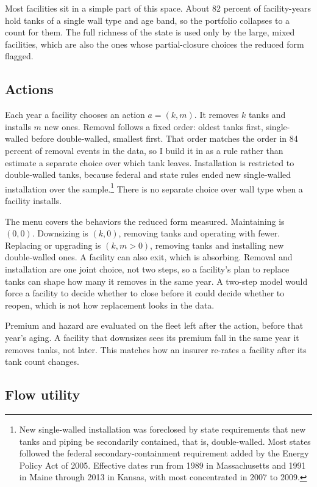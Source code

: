 \documentclass[
  12pt,
]{article}
\begin{document}
Most facilities sit in a simple part of this space. About 82 percent of
facility-years hold tanks of a single wall type and age band, so the
portfolio collapses to a count for them. The full richness of the state
is used only by the large, mixed facilities, which are also the ones
whose partial-closure choices the reduced form flagged.

\subsection{Actions}\label{actions}

Each year a facility chooses an action \(a = (k, m)\). It removes \(k\)
tanks and installs \(m\) new ones. Removal follows a fixed order: oldest
tanks first, single-walled before double-walled, smallest first. That
order matches the order in 84 percent of removal events in the data, so
I build it in as a rule rather than estimate a separate choice over
which tank leaves. Installation is restricted to double-walled tanks,
because federal and state rules ended new single-walled installation
over the sample.\footnote{New single-walled installation was foreclosed
  by state requirements that new tanks and piping be secondarily
  contained, that is, double-walled. Most states followed the federal
  secondary-containment requirement added by the Energy Policy Act of
  2005. Effective dates run from 1989 in Massachusetts and 1991 in Maine
  through 2013 in Kansas, with most concentrated in 2007 to 2009.} There
is no separate choice over wall type when a facility installs.

The menu covers the behaviors the reduced form measured. Maintaining is
\((0,0)\). Downsizing is \((k,0)\), removing tanks and operating with
fewer. Replacing or upgrading is \((k, m>0)\), removing tanks and
installing new double-walled ones. A facility can also exit, which is
absorbing. Removal and installation are one joint choice, not two steps,
so a facility's plan to replace tanks can shape how many it removes in
the same year. A two-step model would force a facility to decide whether
to close before it could decide whether to reopen, which is not how
replacement looks in the data.

Premium and hazard are evaluated on the fleet left after the action,
before that year's aging. A facility that downsizes sees its premium
fall in the same year it removes tanks, not later. This matches how an
insurer re-rates a facility after its tank count changes.

\subsection{Flow utility}\label{flow-utility}
\end{document}
